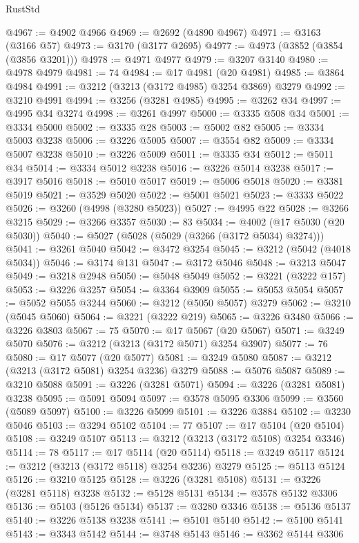 \begin{lexlean}{RustStd}
\begin{coremodule}
@4967 := @4902 @4966
@4969 := @2692 (@4890 @4967)
@4971 := @3163 (@3166 @57)
@4973 := @3170 (@3177 @2695)
@4977 := @4973 (@3852 (@3854 (@3856 @3201)))
@4978 := @4971 @4977
@4979 := @3207 @3140
@4980 := @4978 @4979
@4981 := 74
@4984 := @17 @4981 (@20 @4981)
@4985 := @3864 @4984
@4991 := @3212 (@3213 (@3172 @4985) @3254 @3869) @3279
@4992 := @3210 @4991
@4994 := @3256 (@3281 @4985)
@4995 := @3262 @34
@4997 := @4995 @34 @3274
@4998 := @3261 @4997
@5000 := @3335 @508 @34
@5001 := @3334 @5000
@5002 := @3335 @28
@5003 := @5002 @82
@5005 := @3334 @5003 @3238
@5006 := @3226 @5005
@5007 := @3554 @82
@5009 := @3334 @5007 @3238
@5010 := @3226 @5009
@5011 := @3335 @34
@5012 := @5011 @34
@5014 := @3334 @5012 @3238
@5016 := @3226 @5014 @3238
@5017 := @3917 @5016
@5018 := @5010 @5017
@5019 := @5006 @5018
@5020 := @3381 @5019
@5021 := @3529 @5020
@5022 := @5001 @5021
@5023 := @3333 @5022
@5026 := @3260 (@4998 (@3280 @5023))
@5027 := @4995 @22
@5028 := @3266 @3215
@5029 := @3266 @3357
@5030 := 83
@5034 := @4002 (@17 @5030 (@20 @5030))
@5040 := @5027 (@5028 (@5029 (@3266 (@3172 @5034) @3274)))
@5041 := @3261 @5040
@5042 := @3472 @3254
@5045 := @3212 (@5042 (@4018 @5034))
@5046 := @3174 @131
@5047 := @3172 @5046
@5048 := @3213 @5047
@5049 := @3218 @2948
@5050 := @5048 @5049
@5052 := @3221 (@3222 @157)
@5053 := @3226 @3257
@5054 := @3364 @3909
@5055 := @5053 @5054
@5057 := @5052 @5055 @3244
@5060 := @3212 (@5050 @5057) @3279
@5062 := @3210 (@5045 @5060)
@5064 := @3221 (@3222 @219)
@5065 := @3226 @3480
@5066 := @3226 @3803
@5067 := 75
@5070 := @17 @5067 (@20 @5067)
@5071 := @3249 @5070
@5076 := @3212 (@3213 (@3172 @5071) @3254 @3907)
@5077 := 76
@5080 := @17 @5077 (@20 @5077)
@5081 := @3249 @5080
@5087 := @3212 (@3213 (@3172 @5081) @3254 @3236) @3279
@5088 := @5076 @5087
@5089 := @3210 @5088
@5091 := @3226 (@3281 @5071)
@5094 := @3226 (@3281 @5081) @3238
@5095 := @5091 @5094
@5097 := @3578 @5095 @3306
@5099 := @3560 (@5089 @5097)
@5100 := @3226 @5099
@5101 := @3226 @3884
@5102 := @3230 @5046
@5103 := @3294 @5102
@5104 := 77
@5107 := @17 @5104 (@20 @5104)
@5108 := @3249 @5107
@5113 := @3212 (@3213 (@3172 @5108) @3254 @3346)
@5114 := 78
@5117 := @17 @5114 (@20 @5114)
@5118 := @3249 @5117
@5124 := @3212 (@3213 (@3172 @5118) @3254 @3236) @3279
@5125 := @5113 @5124
@5126 := @3210 @5125
@5128 := @3226 (@3281 @5108)
@5131 := @3226 (@3281 @5118) @3238
@5132 := @5128 @5131
@5134 := @3578 @5132 @3306
@5136 := @5103 (@5126 @5134)
@5137 := @3280 @3346
@5138 := @5136 @5137
@5140 := @3226 @5138 @3238
@5141 := @5101 @5140
@5142 := @5100 @5141
@5143 := @3343 @5142
@5144 := @3748 @5143
@5146 := @3362 @5144 @3306

\end{coremodule}
\end{lexlean}
